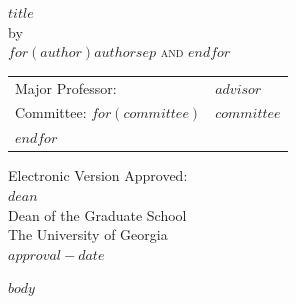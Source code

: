 \documentclass[12pt, notitlepage, twoside]{report}
\newcommand{\doctitle}{$title$}
\newcommand{\docauthor}{$for(author)$$author$$sep$ and $endfor$}
\begin{document}
\newpage
\thispagestyle{empty}
\vspace*{18pt}
\begin{center}
  \textsc{\doctitle}\\[18pt]
  by\\[18pt]
  \textsc{\docauthor}
\end{center}
\vfill

\begin{flushright}
  \begin{tabular}{ll}
    Major Professor: & $advisor$ \\ [8pt]
    Committee:
$for(committee)$
    & $committee$ \\
$endfor$
  \end{tabular}
\end{flushright}

\vspace*{3cm}

\begin{flushleft}
  Electronic Version Approved:\\[12pt]
  $dean$\\
  Dean of the Graduate School\\
  The University of Georgia\\
  $approval-date$
\end{flushleft}
\vspace*{1.5cm}

\setcounter{tocdepth}{1}
\tableofcontents

\clearpage
{}

$body$

\newpage
\printbibliography[heading=bibintoc,title={Bibliography}]
\end{document}
